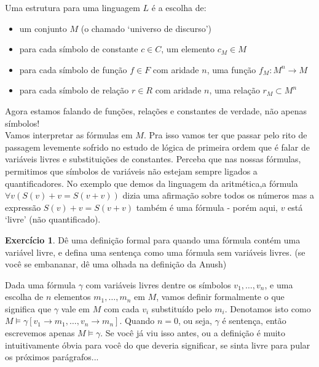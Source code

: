 \documentclass[11pt]{article}
\renewcommand{\textbf}[1]{{\fakebold#1}}
\newcommand{\luamedio}{
\emoji{first-quarter-moon}
}
\theoremstyle{definition}
\theoremstyle{definition}
\theoremstyle{definition}
\theoremstyle{definition}
\theoremstyle{definition}
\theoremstyle{definition}
\theoremstyle{definition}
\theoremstyle{definition}
\newtheorem*{definition*}{Definição}
\newenvironment{definicao*}{
\definecolor{shadecolor}{HTML}{defcfc}
\begin{shaded}
\begin{definition*}
}
{
\end{definition*}
\end{shaded}
}
\theoremstyle{definition}
\theoremstyle{definition}
\theoremstyle{definition}
\theoremstyle{definition}
\theoremstyle{definition}
\newtheorem{exersisio}{Exercício}
\newenvironment{exercicio}{
\definecolor{shadecolor}{HTML}{CFB5FF}
\begin{shaded}
\begin{exersisio}
}
{
\end{exersisio}
\end{shaded}
}
\begin{document}
\begin{definicao*}[Estrutura]
Uma \textbf{estrutura} para uma linguagem $L$ é a escolha de:

\begin{itemize}[label=]
  \item um conjunto $M$ (o chamado `universo de discurso')
  \item para cada símbolo de constante $c \in C$, um elemento $c_M \in M$
  \item para cada símbolo de função $f \in F$ com aridade $n$, uma função $f_M: M^n \rightarrow M$
  \item para cada símbolo de relação $r \in R$ com aridade $n$, uma relação $r_M \subset M^n$
\end{itemize}

\end{definicao*}

Agora estamos falando de funções, relações e constantes de verdade, não apenas símbolos!\\

Vamos interpretar as fórmulas em $M$. Pra isso vamos ter que passar pelo rito de passagem levemente sofrido no estudo de lógica de primeira ordem que é falar de variáveis livres e substituições de constantes. Perceba que nas nossas fórmulas, permitimos que símbolos de variáveis não estejam sempre ligados a quantificadores. No exemplo que demos da linguagem da aritmética,a fórmula $\forall v (S(v) + v = S(v + v))$ dizia uma afirmação sobre todos os números mas a expressão $S(v) + v = S(v + v)$ também é uma fórmula - porém aqui, $v$ está `livre' (não quantificado). 

\begin{exercicio}
  \luamedio Dê uma definição formal para quando uma fórmula contém uma variável livre, e defina uma \textbf{sentença} como uma fórmula sem variáveis livres. (se você se embananar, dê uma olhada na definição da Anush)
\end{exercicio}

Dada uma fórmula $\gamma$ com variáveis livres dentre os símbolos $v_1, \dots, v_n$, e uma escolha de $n$ elementos $m_1,\dots, m_n$ em $M$, vamos definir formalmente o que significa que $\gamma$ vale em $M$ com cada $v_i$ substituído pelo $m_i$. Denotamos isto como $M \vDash \gamma[v_1 \rightarrow m_1,\dots, v_n \rightarrow m_n]$. Quando $n = 0$, ou seja, $\gamma$ é sentença, então escrevemos apenas $M \vDash \gamma$. Se você já viu isso antes, ou a definição é muito intuitivamente óbvia para você do que deveria significar, se sinta livre para pular os próximos parágrafos...
\end{document}
